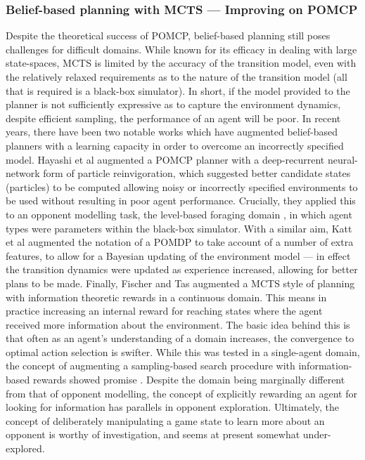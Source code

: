 \subsubsection{Belief-based planning with MCTS --- Improving on POMCP}  
Despite the theoretical success of POMCP, belief-based planning still poses challenges for difficult domains. 
While known for its efficacy in dealing with large state-spaces, MCTS is limited by the accuracy of the transition model, even with the relatively relaxed requirements as to the nature of the transition model (all that is required is a black-box simulator). In short, if the model provided to the planner is not sufficiently expressive as to capture the environment dynamics, despite efficient sampling, the performance of an agent will be poor. 
\newline \newline
In recent years, there have been two notable works which have augmented belief-based planners with a learning capacity in order to overcome an incorrectly specified model. 
\newline \newline
Hayashi et al \cite{Hayashi_et_al2020} augmented a POMCP planner with a deep-recurrent neural-network form of particle reinvigoration, which suggested better candidate states (particles) to be computed allowing noisy or incorrectly specified environments to be used without resulting in poor agent performance. Crucially, they applied this to an opponent modelling task, the level-based foraging domain \cite{Papoudakis2020}, in which agent types were parameters within the black-box simulator. 
\newline \newline
With a similar aim, Katt et al \cite{Katt2017} augmented the notation of a POMDP to take account of a number of extra features, to allow for a Bayesian updating of the environment model --- in effect the transition dynamics were updated as experience increased, allowing for better plans to be made. 
\newline \newline
Finally, Fischer and Tas augmented a MCTS style of planning with information theoretic rewards in a continuous domain. This means in practice increasing an internal reward for reaching states where the agent received more information about the environment. The basic idea behind this is that often as an agent's understanding of a domain increases, the convergence to optimal action selection is swifter. While this was tested in a single-agent domain, the concept of augmenting a sampling-based search procedure with information-based rewards showed promise \cite{Fischer2020}. Despite the domain being marginally different from that of opponent modelling, the concept of explicitly rewarding an agent for looking for information has parallels in opponent exploration. Ultimately, the concept of deliberately manipulating a game state to learn more about an opponent is worthy of investigation, and seems at present somewhat under-explored.

